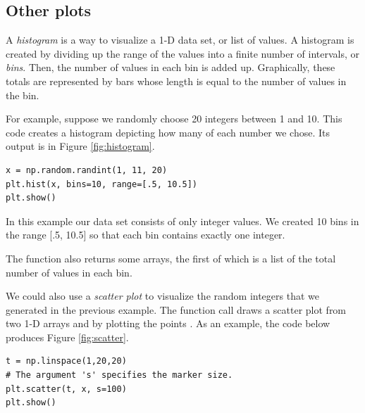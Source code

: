 \subsection*{Other plots}
A \emph{histogram} is a way to visualize a 1-D data set, or list of values. 
A histogram is created by dividing up the range of the values into a finite number of intervals, or \emph{bins}.
Then, the number of values in each bin is added up.
Graphically, these totals are represented by bars whose length is equal to the number of values in the bin.

For example, suppose we randomly choose 20 integers between 1 and 10.
This code creates a histogram depicting how many of each number we chose.
Its output is in Figure \ref{fig:histogram}.

\begin{lstlisting}
x = np.random.randint(1, 11, 20)
plt.hist(x, bins=10, range=[.5, 10.5])
plt.show()
\end{lstlisting}

In this example our data set  consists of only integer values.
We created 10 bins in the range [.5, 10.5] so that each bin contains exactly one integer.

The function  also returns some arrays, the first of which is a list of the total number of values in each bin.

We could also use a \emph{scatter plot} to visualize the random integers  that we generated in the previous example. 
The  function call  draws a scatter plot from two 1-D arrays  and  by plotting the points .
As an example, the code below produces Figure \ref{fig:scatter}.

\begin{lstlisting}
t = np.linspace(1,20,20)
# The argument 's' specifies the marker size.
plt.scatter(t, x, s=100)
plt.show()
\end{lstlisting}


